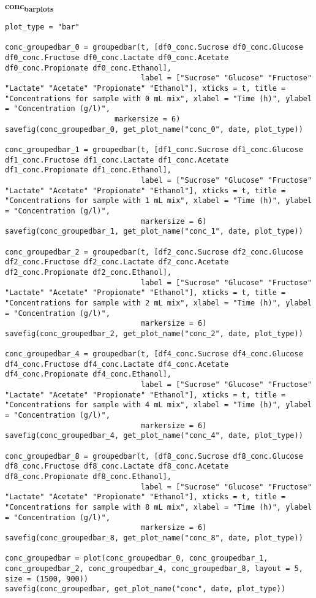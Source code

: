 \documentclass[11pt]{article}
\begin{document}
\textbf{conc\textsubscript{bar}\textsubscript{plots}}
\begin{verbatim}
plot_type = "bar"

conc_groupedbar_0 = groupedbar(t, [df0_conc.Sucrose df0_conc.Glucose df0_conc.Fructose df0_conc.Lactate df0_conc.Acetate df0_conc.Propionate df0_conc.Ethanol],
                               label = ["Sucrose" "Glucose" "Fructose" "Lactate" "Acetate" "Propionate" "Ethanol"], xticks = t, title = "Concentrations for sample with 0 mL mix", xlabel = "Time (h)", ylabel = "Concentration (g/l)",
                         markersize = 6)
savefig(conc_groupedbar_0, get_plot_name("conc_0", date, plot_type))

conc_groupedbar_1 = groupedbar(t, [df1_conc.Sucrose df1_conc.Glucose df1_conc.Fructose df1_conc.Lactate df1_conc.Acetate df1_conc.Propionate df1_conc.Ethanol],
                               label = ["Sucrose" "Glucose" "Fructose" "Lactate" "Acetate" "Propionate" "Ethanol"], xticks = t, title = "Concentrations for sample with 1 mL mix", xlabel = "Time (h)", ylabel = "Concentration (g/l)",
                               markersize = 6)
savefig(conc_groupedbar_1, get_plot_name("conc_1", date, plot_type))

conc_groupedbar_2 = groupedbar(t, [df2_conc.Sucrose df2_conc.Glucose df2_conc.Fructose df2_conc.Lactate df2_conc.Acetate df2_conc.Propionate df2_conc.Ethanol],
                               label = ["Sucrose" "Glucose" "Fructose" "Lactate" "Acetate" "Propionate" "Ethanol"], xticks = t, title = "Concentrations for sample with 2 mL mix", xlabel = "Time (h)", ylabel = "Concentration (g/l)",
                               markersize = 6)
savefig(conc_groupedbar_2, get_plot_name("conc_2", date, plot_type))

conc_groupedbar_4 = groupedbar(t, [df4_conc.Sucrose df4_conc.Glucose df4_conc.Fructose df4_conc.Lactate df4_conc.Acetate df4_conc.Propionate df4_conc.Ethanol],
                               label = ["Sucrose" "Glucose" "Fructose" "Lactate" "Acetate" "Propionate" "Ethanol"], xticks = t, title = "Concentrations for sample with 4 mL mix", xlabel = "Time (h)", ylabel = "Concentration (g/l)",
                               markersize = 6)
savefig(conc_groupedbar_4, get_plot_name("conc_4", date, plot_type))

conc_groupedbar_8 = groupedbar(t, [df8_conc.Sucrose df8_conc.Glucose df8_conc.Fructose df8_conc.Lactate df8_conc.Acetate df8_conc.Propionate df8_conc.Ethanol],
                               label = ["Sucrose" "Glucose" "Fructose" "Lactate" "Acetate" "Propionate" "Ethanol"], xticks = t, title = "Concentrations for sample with 8 mL mix", xlabel = "Time (h)", ylabel = "Concentration (g/l)",
                               markersize = 6)
savefig(conc_groupedbar_8, get_plot_name("conc_8", date, plot_type))

conc_groupedbar = plot(conc_groupedbar_0, conc_groupedbar_1, conc_groupedbar_2, conc_groupedbar_4, conc_groupedbar_8, layout = 5, size = (1500, 900))
savefig(conc_groupedbar, get_plot_name("conc", date, plot_type))

\end{verbatim}
\end{document}
